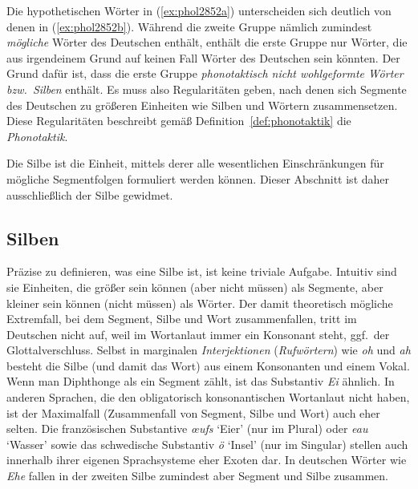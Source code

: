 Die hypothetischen Wörter in (\ref{ex:phol2852a}) unterscheiden sich deutlich von denen in (\ref{ex:phol2852b}).
Während die zweite Gruppe nämlich zumindest \textit{mögliche} Wörter des Deutschen enthält, enthält die erste Gruppe nur Wörter, die aus irgendeinem Grund auf keinen Fall Wörter des Deutschen sein könnten.
Der Grund dafür ist, dass die erste Gruppe \textit{phonotaktisch nicht wohlgeformte Wörter bzw.\ Silben} enthält.
Es muss also Regularitäten geben, nach denen sich Segmente des Deutschen zu größeren Einheiten wie Silben und Wörtern zusammensetzen.
Diese Regularitäten beschreibt gemäß Definition~\ref{def:phonotaktik} die \textit{Phonotaktik}.



Die Silbe ist die Einheit, mittels derer alle wesentlichen Einschränkungen für mögliche Segmentfolgen formuliert werden können.
Dieser Abschnitt ist daher ausschließlich der Silbe gewidmet.

\subsection{Silben}

\label{sec:silben}


Präzise zu definieren, was eine Silbe ist, ist keine triviale Aufgabe.
Intuitiv sind sie Einheiten, die größer sein können (aber nicht müssen) als Segmente, aber kleiner sein können (nicht müssen) als Wörter.
Der damit theoretisch mögliche Extremfall, bei dem Segment, Silbe und Wort zusammenfallen, tritt im Deutschen nicht auf, weil im Wortanlaut immer ein Konsonant steht, ggf.\ der Glottalverschluss.
Selbst in marginalen \textit{Interjektionen} (\textit{Rufwörtern}) wie \textit{oh} \textipa{[Po:]} und \textit{ah} \textipa{[Pa:]} besteht die Silbe (und damit das Wort) aus einem Konsonanten und einem Vokal.
Wenn man Diphthonge als ein Segment zählt, ist das Substantiv \textit{Ei} \textipa{[P\t{aE}]} ähnlich.
In anderen Sprachen, die den obligatorisch konsonantischen Wortanlaut nicht haben, ist der Maximalfall (Zusammenfall von Segment, Silbe und Wort) auch eher selten.
Die französischen Substantive \textit{œufs} \textipa{[\o:]} `Eier' (nur im Plural) oder \textit{eau} \textipa{[o:]} `Wasser' sowie das schwedische Substantiv \textit{ö} \textipa{[\oe:]} `Insel' (nur im Singular) stellen auch innerhalb ihrer eigenen Sprachsysteme eher Exoten dar.
In deutschen Wörter wie \textit{Ehe} \textipa{[Pe:@]} fallen in der zweiten Silbe zumindest aber Segment und Silbe \textipa{[@]} zusammen.

